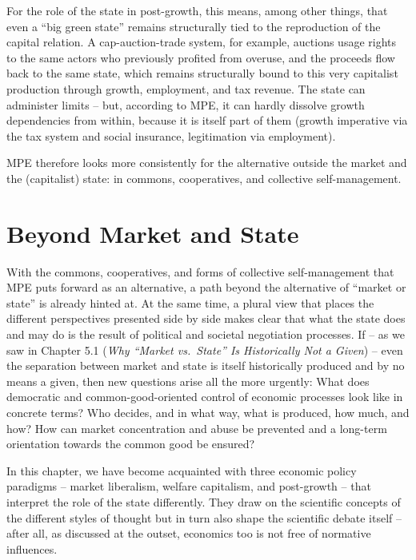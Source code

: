 \documentclass[
  british,
  a4paper,
  DIV=11,
  numbers=noendperiod,
  oneside,
  openany]{scrreprt}
\begin{document}
For the role of the state in post-growth, this means, among other
things, that even a ``big green state'' remains structurally tied to the
reproduction of the capital relation. A cap-auction-trade system, for
example, auctions usage rights to the same actors who previously
profited from overuse, and the proceeds flow back to the same state,
which remains structurally bound to this very capitalist production
through growth, employment, and tax revenue. The state can administer
limits -- but, according to MPE, it can hardly dissolve growth
dependencies from within, because it is itself part of them (growth
imperative via the tax system and social insurance, legitimation via
employment).

MPE therefore looks more consistently for the alternative outside the
market and the (capitalist) state: in commons, cooperatives, and
collective self-management.

\section{Beyond Market and State}\label{beyond-market-and-state}

With the commons, cooperatives, and forms of collective self-management
that MPE puts forward as an alternative, a path beyond the alternative
of ``market or state'' is already hinted at. At the same time, a plural
view that places the different perspectives presented side by side makes
clear that what the state does and may do is the result of political and
societal negotiation processes. If -- as we saw in Chapter 5.1
(\emph{Why ``Market vs.~State'' Is Historically Not a Given}) -- even
the separation between market and state is itself historically produced
and by no means a given, then new questions arise all the more urgently:
What does democratic and common-good-oriented control of economic
processes look like in concrete terms? Who decides, and in what way,
what is produced, how much, and how? How can market concentration and
abuse be prevented and a long-term orientation towards the common good
be ensured?

In this chapter, we have become acquainted with three economic policy
paradigms -- market liberalism, welfare capitalism, and post-growth --
that interpret the role of the state differently. They draw on the
scientific concepts of the different styles of thought but in turn also
shape the scientific debate itself -- after all, as discussed at the
outset, economics too is not free of normative influences.
\end{document}
